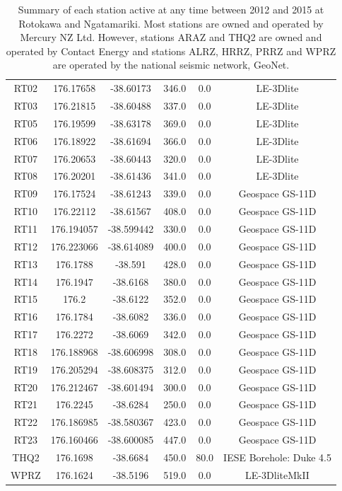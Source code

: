 \begin{table}
{\begin{tabular}{cccccc}
    RT02 & 176.17658 & -38.60173 & 346.0 & 0.0 & LE-3Dlite \\
    RT03 & 176.21815 & -38.60488 & 337.0 & 0.0 & LE-3Dlite \\
    RT05 & 176.19599 & -38.63178 & 369.0 & 0.0 & LE-3Dlite \\
    RT06 & 176.18922 & -38.61694 & 366.0 & 0.0 & LE-3Dlite \\
    RT07 & 176.20653 & -38.60443 & 320.0 & 0.0 & LE-3Dlite \\
    RT08 & 176.20201 & -38.61436 & 341.0 & 0.0 & LE-3Dlite \\
    RT09 & 176.17524 & -38.61243 & 339.0 & 0.0 & Geospace GS-11D \\
    RT10 & 176.22112 & -38.61567 & 408.0 & 0.0 & Geospace GS-11D \\
    RT11 & 176.194057 & -38.599442 & 330.0 & 0.0 & Geospace GS-11D \\
    RT12 & 176.223066 & -38.614089 & 400.0 & 0.0 & Geospace GS-11D \\
    RT13 & 176.1788 & -38.591 & 428.0 & 0.0 & Geospace GS-11D \\
    RT14 & 176.1947 & -38.6168 & 380.0 & 0.0 & Geospace GS-11D \\
    RT15 & 176.2 & -38.6122 & 352.0 & 0.0 & Geospace GS-11D \\
    RT16 & 176.1784 & -38.6082 & 336.0 & 0.0 & Geospace GS-11D \\
    RT17 & 176.2272 & -38.6069 & 342.0 & 0.0 & Geospace GS-11D \\
    RT18 & 176.188968 & -38.606998 & 308.0 & 0.0 & Geospace GS-11D \\
    RT19 & 176.205294 & -38.608375 & 312.0 & 0.0 & Geospace GS-11D \\
    RT20 & 176.212467 & -38.601494 & 300.0 & 0.0 & Geospace GS-11D \\
    RT21 & 176.2245 & -38.6284 & 250.0 & 0.0 & Geospace GS-11D \\
    RT22 & 176.186985 & -38.580367 & 423.0 & 0.0 & Geospace GS-11D \\
    RT23 & 176.160466 & -38.600085 & 447.0 & 0.0 & Geospace GS-11D \\
    THQ2 & 176.1698 & -38.6684 & 450.0 & 80.0 & IESE Borehole: Duke 4.5 \\
    WPRZ & 176.1624 & -38.5196 & 519.0 & 0.0 & LE-3DliteMkII \\
\end{tabular}}
\caption[Seismograph station information]{{
Summary of each station active at any time between 2012 and 2015 at Rotokawa and Ngatamariki. Most stations are owned and operated by Mercury NZ Ltd. However, stations ARAZ and THQ2 are owned and operated by Contact Energy and stations ALRZ, HRRZ, PRRZ and WPRZ are operated by the national seismic network, GeoNet.}}
\label{station_table}
\end{table}

